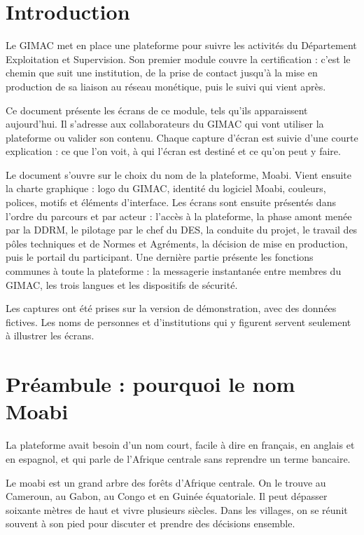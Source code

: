 \documentclass[12pt,a4paper]{article}
\begin{document}
\tableofcontents
\clearpage

\section{Introduction}
Le GIMAC met en place une plateforme pour suivre les activités du Département Exploitation et Supervision. Son premier module couvre la certification : c'est le chemin que suit une institution, de la prise de contact jusqu'à la mise en production de sa liaison au réseau monétique, puis le suivi qui vient après.

Ce document présente les écrans de ce module, tels qu'ils apparaissent aujourd'hui. Il s'adresse aux collaborateurs du GIMAC qui vont utiliser la plateforme ou valider son contenu. Chaque capture d'écran est suivie d'une courte explication : ce que l'on voit, à qui l'écran est destiné et ce qu'on peut y faire.

Le document s'ouvre sur le choix du nom de la plateforme, Moabi. Vient ensuite la charte graphique : logo du GIMAC, identité du logiciel Moabi, couleurs, polices, motifs et éléments d'interface. Les écrans sont ensuite présentés dans l'ordre du parcours et par acteur : l'accès à la plateforme, la phase amont menée par la DDRM, le pilotage par le chef du DES, la conduite du projet, le travail des pôles techniques et de Normes et Agréments, la décision de mise en production, puis le portail du participant. Une dernière partie présente les fonctions communes à toute la plateforme : la messagerie instantanée entre membres du GIMAC, les trois langues et les dispositifs de sécurité.

Les captures ont été prises sur la version de démonstration, avec des données fictives. Les noms de personnes et d'institutions qui y figurent servent seulement à illustrer les écrans.

\section{Préambule : pourquoi le nom Moabi}
La plateforme avait besoin d'un nom court, facile à dire en français, en anglais et en espagnol, et qui parle de l'Afrique centrale sans reprendre un terme bancaire.

Le moabi est un grand arbre des forêts d'Afrique centrale. On le trouve au Cameroun, au Gabon, au Congo et en Guinée équatoriale. Il peut dépasser soixante mètres de haut et vivre plusieurs siècles. Dans les villages, on se réunit souvent à son pied pour discuter et prendre des décisions ensemble.
\end{document}
